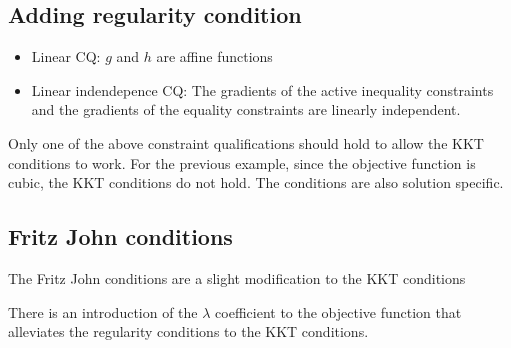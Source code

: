 \subsection{Adding regularity condition}
\begin{itemize}
  \item Linear CQ: $g$ and $h$ are affine functions
  \item Linear indendepence CQ: The gradients of the active inequality constraints and the gradients of the equality constraints are linearly independent.
\end{itemize}
Only one of the above constraint qualifications should hold to allow the KKT conditions to work. For the previous example, since the objective function is cubic, the KKT conditions do not hold. The conditions are also solution specific.

\subsection{Fritz John conditions}
The Fritz John conditions are a slight modification to the KKT conditions


There is an introduction of the $\lambda$ coefficient to the objective function that alleviates the regularity conditions to the KKT conditions. 

